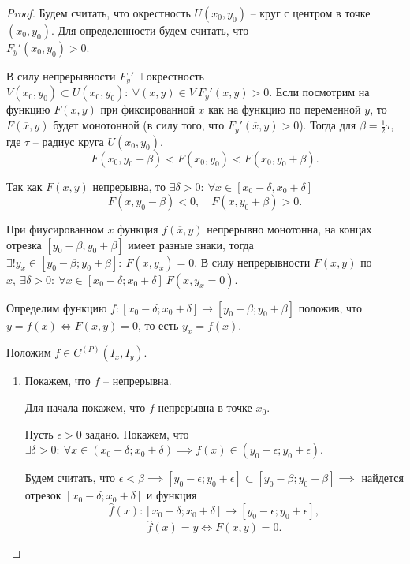 \begin{proof}
    Будем считать, что окрестность $ U(x_0,y_0) $ -- круг с центром в точке $ (x_0,y_0) $. Для определенности будем считать, что \\ $ F_y'(x_0,y_0) > 0 $.

    В силу непрерывности $ F_y' \ \exists $ окрестность $ V(x_0,y_0) \subset U(x_0,y_0): \ \forall(x,y) \in V \ F_y'(x,y) > 0 $. Если посмотрим на функцию $ F(x,y) $ при фиксированной $ x $ как на функцию по переменной $ y $, то $ F(\overline{x},y) $ будет монотонной (в силу того, что $ F_y'(\overline{x},y) > 0 $). Тогда для $ \beta = \frac{1}{2}\tau $, где $ \tau $ -- радиус круга $ U(x_0,y_0) $.
    \[
        F(x_0,y_0 - \beta) < F(x_0,y_0) < F(x_0, y_0 + \beta).
    \]

    Так как $ F(x,y) $ непрерывна, то $ \exists\delta > 0: \ \forall x \in [x_0 - \delta, x_0 + \delta] $
    \[
        F(x,y_0 - \beta) < 0, \quad F(x,y_0 + \beta) > 0.
    \]

    При фиусированном $ x $ функция $ f(\overline{x},y) $ непрерывно монотонна, на концах отрезка $ [y_0 - \beta;y_0 + \beta] $ имеет разные знаки, тогда $ \exists!y_x \in [y_0-\beta;y_0+\beta]: \ F(\overline{x},y_x) = 0 $. В силу непрерывности $ F(x,y) $ по $ x, \ \exists\delta>0: \ \forall x \in [x_0 - \delta;x_0 + \delta] \ F(x,y_x = 0) $.

    Определим функцию $ f:[x_0-\delta;x_0+\delta]\rightarrow[y_0-\beta;y_0 + \beta] $ положив, что $ y=f(x) \iff F(x,y) = 0 $, то есть $ y_x = f(x) $.

    Положим $ f\in C^{(P)}(I_x,I_y) $.
    \begin{enumerate}
        \item Покажем, что $ f $ -- непрерывна.

              Для начала покажем, что $ f $ непрерывна в точке $ x_0 $.

              Пусть $ \epsilon > 0 $ задано. Покажем, что $ \exists \delta > 0: \ \forall x \in (x_0 - \delta;x_0 + \delta) \implies f(x) \in (y_0-\epsilon;y_0+\epsilon) $.

              Будем считать, что $ \epsilon < \beta \implies [y_0-\epsilon;y_0+\epsilon]\subset [y_0-\beta;y_0 + \beta] \implies $ найдется отрезок $ [x_0-\delta;x_0+\delta] $ и функция
              \[
                  \hat{f}(x): [x_0-\delta;x_0 + \delta]\rightarrow[y_0 -\epsilon;y_0+\epsilon],
              \]
              \[
                  \hat{f}(x) = y \iff F(x,y) = 0.
              \]


\end{enumerate}
\end{proof}
